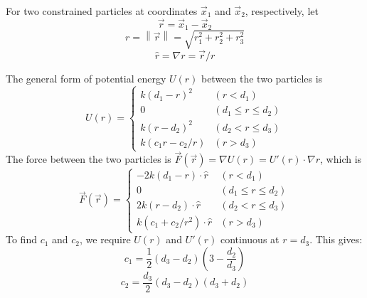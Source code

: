 \documentclass[10pt]{article}
\newcommand{\norm}[1]{\left\lVert#1\right\rVert}
\begin{document}
For two constrained particles at coordinates $\vec{x}_1$ and $\vec{x}_2$,
respectively, let
$$\vec{r}=\vec{x}_1-\vec{x}_2$$
$$r=\norm{\vec{r}}=\sqrt{r_1^2+r_2^2+r_3^2}$$
$$\hat{r}=\nabla r=\vec{r}/r$$

The general form of potential energy $U(r)$ between the two particles is
\begin{equation*}
U(r)=\left\{\begin{array}{ll}
k(d_1-r)^2 & (r < d_1) \\
0 & (d_1\le r\le d_2) \\
k(r-d_2)^2 & (d_2 < r \le d_3) \\
k(c_1 r - c_2/r) & (r > d_3)
\end{array}\right.
\end{equation*}
The force between the two particles is $\vec{F}(\vec{r})=\nabla
U(r)=U'(r)\cdot\nabla r$, which is
\[
\vec{F}(\vec{r})=\left\{\begin{array}{ll}
-2k(d_1-r)\cdot\hat{r} & (r < d_1) \\
0 & (d_1\le r\le d_2) \\
2k(r-d_2)\cdot\hat{r} & (d_2 < r \le d_3) \\
k(c_1+c_2/r^2)\cdot\hat{r} & (r > d_3)
\end{array}\right.
\]
To find $c_1$ and $c_2$, we require $U(r)$ and $U'(r)$ continuous at
$r=d_3$. This gives:
\[
c_1=\frac{1}{2}(d_3-d_2)\left(3-\frac{d_2}{d_3}\right)
\]
\[
c_2=\frac{d_3}{2}(d_3-d_2)(d_3+d_2)
\]
\end{document}
